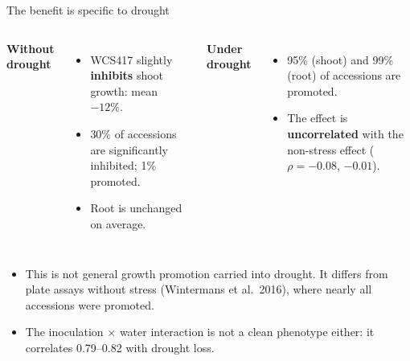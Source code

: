 \documentclass[aspectratio=169,11pt]{beamer}
\newcommand{\key}[1]{\textcolor{accent}{\textbf{#1}}}
\newcommand{\bad}[1]{\textcolor{warn}{\textbf{#1}}}
\begin{document}
\begin{frame}{The benefit is specific to drought}
  \begin{columns}[T]
    \textbf{Without drought}
    \begin{itemize}
      \item WCS417 slightly \bad{inhibits} shoot growth: mean $-12\%$.
      \item 30\% of accessions are significantly inhibited; 1\% promoted.
      \item Root is unchanged on average.
    \end{itemize}
    \textbf{Under drought}
    \begin{itemize}
      \item 95\% (shoot) and 99\% (root) of accessions are promoted.
      \item The effect is \key{uncorrelated} with the non-stress effect
        ($\rho=-0.08$, $-0.01$).
    \end{itemize}
  \end{columns}
  \vspace{0.8em}
  \begin{itemize}
    \item This is not general growth promotion carried into drought. It differs from
      plate assays without stress (Wintermans et al.\ 2016), where nearly all accessions
      were promoted.
    \item The inoculation $\times$ water interaction is not a clean phenotype either: it
      correlates 0.79--0.82 with drought loss.
  \end{itemize}
\end{frame}
\end{document}
